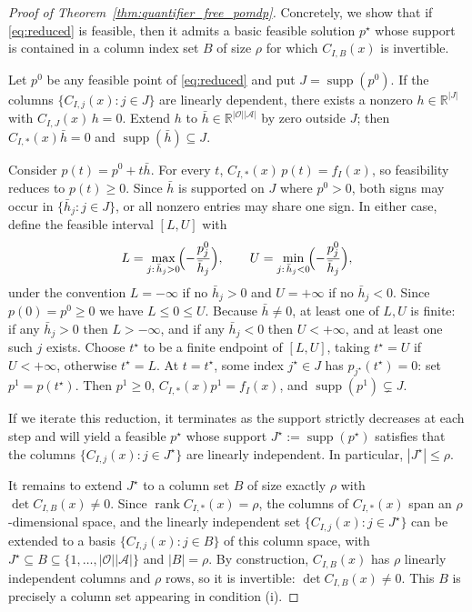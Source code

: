 \documentclass{article}
\theoremstyle{definition}
\theoremstyle{remark}
\newcommand{\supp}{\operatorname{supp}}
\newcommand{\rank}{\operatorname{rank}}
\begin{document}
\begin{proof}[Proof of Theorem~\ref{thm:quantifier_free_pomdp}]
Concretely, we show that if \eqref{eq:reduced} is feasible, then it admits a basic feasible solution $p^\star$ whose support is contained in a column index set $B$ of size $\rho$ for which $C_{I,B}(x)$ is invertible.

Let $p^0$ be any feasible point of \eqref{eq:reduced} and put $J=\supp(p^0)$. If the columns $\{C_{I,j}(x):j\in J\}$ are linearly dependent, there exists a nonzero $h\in\mathbb R^{|J|}$ with $C_{I,J}(x)\,h=0$. Extend $h$ to $\bar h\in\mathbb R^{|\mathcal O||\mathcal A|}$ by zero outside $J$; then $C_{I,*}(x)\bar h=0$ and $\supp(\bar h)\subseteq J$.

Consider $p(t)=p^0+t\bar h$. For every $t$, $C_{I,*}(x)\,p(t)=f_I(x)$, so feasibility reduces to $p(t)\ge 0$. Since $\bar h$ is supported on $J$ where $p^0>0$, both signs may occur in $\{\bar h_j:j\in J\}$, or all nonzero entries may share one sign. In either case, define the feasible interval $[L,U]$ with
\[
L = \max_{j:\,\bar h_j>0} \!\Bigl(-\frac{p^0_j}{\bar h_j}\Bigr),
\qquad
U = \min_{j:\,\bar h_j<0} \!\Bigl(-\frac{p^0_j}{\bar h_j}\Bigr),
\]
under the convention $L=-\infty$ if no $\bar h_j>0$ and $U=+\infty$ if no $\bar h_j<0$. Since $p(0)=p^0\ge 0$ we have $L\le 0\le U$. Because $\bar h\ne 0$, at least one of $L,U$ is finite: if any $\bar h_j>0$ then $L>-\infty$, and if any $\bar h_j<0$ then $U<+\infty$, and at least one such $j$ exists. Choose $t^\star$ to be a finite endpoint of $[L,U]$, taking $t^\star=U$ if $U<+\infty$, otherwise $t^\star=L$. At $t=t^\star$, some index $j^\star\in J$ has $p_{j^\star}(t^\star)=0$: set $p^1=p(t^\star)$. Then $p^1\ge 0$, $C_{I,*}(x)p^1=f_I(x)$, and $\supp(p^1)\subsetneq J$.

If we iterate this reduction, it terminates as the support strictly decreases at each step and will yield a feasible $p^\star$ whose support $J^\star:=\supp(p^\star)$ satisfies that the columns $\{C_{I,j}(x):j\in J^\star\}$ are linearly independent. In particular, $|J^\star|\le\rho$.

It remains to extend $J^\star$ to a column set $B$ of size exactly $\rho$ with $\det C_{I,B}(x)\ne 0$. Since $\rank C_{I,*}(x)=\rho$, the columns of $C_{I,*}(x)$ span an $\rho$-dimensional space, and the linearly independent set $\{C_{I,j}(x):j\in J^\star\}$ can be extended to a basis $\{C_{I,j}(x):j\in B\}$ of this column space, with $J^\star\subseteq B\subseteq\{1,\dots,|\mathcal O||\mathcal A|\}$ and $|B|=\rho$. By construction, $C_{I,B}(x)$ has $\rho$ linearly independent columns and $\rho$ rows, so it is invertible: $\det C_{I,B}(x)\ne 0$. This $B$ is precisely a column set appearing in condition (i).


\end{proof}
\end{document}
